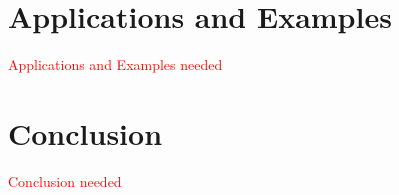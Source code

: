 \documentclass[letterpaper, 10 pt, conference]{ieeeconf}
\providecommand{\note}{\textcolor{red}} %
\begin{document}
\section{Applications and Examples} \label{sec:applicationsAndExamples}
\note{Applications and Examples needed}

\section{Conclusion} \label{sec:conclusionAndFutureWork}
\note{Conclusion needed}

%

\end{document}
